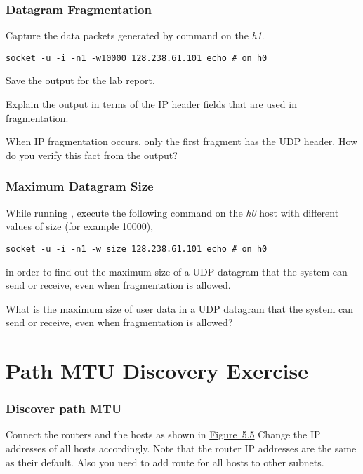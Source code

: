 \documentclass{../UTNetLab}
\begin{document}
\section{Datagram Fragmentation}
Capture the data packets generated by  command on the \textit{h1}.

\begin{lstlisting}[emph={h1,netlab},morekeywords={[3]echo}]
socket -u -i -n1 -w10000 128.238.61.101 echo # on h0
    \end{lstlisting}
Save the  output for the lab report.

\begin{report}
    \item Explain the  output in terms of the IP header fields that are used in fragmentation.

    \item When IP fragmentation occurs, only the first fragment has the UDP header.
    How do you verify this fact from the  output?
\end{report}


\section{Maximum Datagram Size}
\label{sec:MaxDatagramSize}
While running , execute the following command on the \textit{h0} host with different values of size (for example 10000),
\begin{lstlisting}[emph={size, h1,netlab},morekeywords={[3]echo}]
socket -u -i -n1 -w size 128.238.61.101 echo # on h0
\end{lstlisting}
in order to find out the maximum size of a UDP datagram that the system can send or receive, even when fragmentation is allowed.

\begin{report}
    \item What is the maximum size of user data in a UDP datagram that the system can send or receive, even when fragmentation is allowed?
\end{report}


\part{Path MTU Discovery Exercise}\label{sec:PMTUD}

\section{Discover path MTU}
Connect the routers and the hosts as shown in \hyperref[fig:5.5]{Figure~5.5} Change the IP addresses of all hosts accordingly.
Note that the router IP addresses are the same as their default.
Also you need to add route for all hosts to other subnets.
\end{document}
